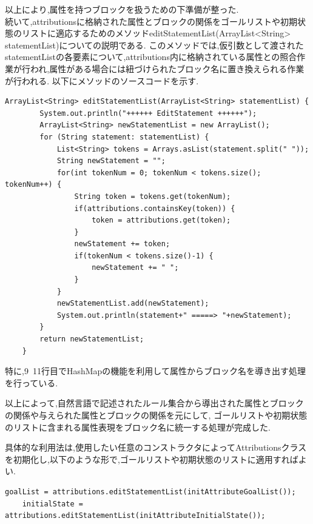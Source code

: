 \documentclass[uplatex,12pt]{jsarticle}
\begin{document}
以上により,属性を持つブロックを扱うための下準備が整った. \\

続いて,attributionsに格納された属性とブロックの関係をゴールリストや初期状態のリストに適応するためのメソッドeditStatementList(ArrayList<String> statementList)についての説明である.
このメソッドでは,仮引数として渡されたstatementListの各要素について,attributions内に格納されている属性との照合作業が行われ,属性がある場合には紐づけられたブロック名に置き換えられる作業が行われる.
以下にメソッドのソースコードを示す.
\begin{lstlisting}[caption=editStatementListメソッドの実装, label=mid]
    ArrayList<String> editStatementList(ArrayList<String> statementList) {
		System.out.println("++++++ EditStatement ++++++");
		ArrayList<String> newStatementList = new ArrayList();
		for (String statement: statementList) {
			List<String> tokens = Arrays.asList(statement.split(" "));
			String newStatement = "";
			for(int tokenNum = 0; tokenNum < tokens.size(); tokenNum++) {
				String token = tokens.get(tokenNum);
				if(attributions.containsKey(token)) {
					token = attributions.get(token);
				}
				newStatement += token;
				if(tokenNum < tokens.size()-1) {
					newStatement += " ";
				}
			}
			newStatementList.add(newStatement);
			System.out.println(statement+" =====> "+newStatement);
		}
		return newStatementList;
	}
\end{lstlisting}
特に,9~11行目でHashMapの機能を利用して属性からブロック名を導き出す処理を行っている.

以上によって,自然言語で記述されたルール集合から導出された属性とブロックの関係や与えられた属性とブロックの関係を元にして,
ゴールリストや初期状態のリストに含まれる属性表現をブロック名に統一する処理が完成した.

具体的な利用法は,使用したい任意のコンストラクタによってAttributionsクラスを初期化し,以下のような形で,ゴールリストや初期状態のリストに適用すればよい.
\begin{lstlisting}[caption=editStatementListの利用, label=mid]
    goalList = attributions.editStatementList(initAttributeGoalList());
	initialState = attributions.editStatementList(initAttributeInitialState());
\end{lstlisting}
\end{document}
